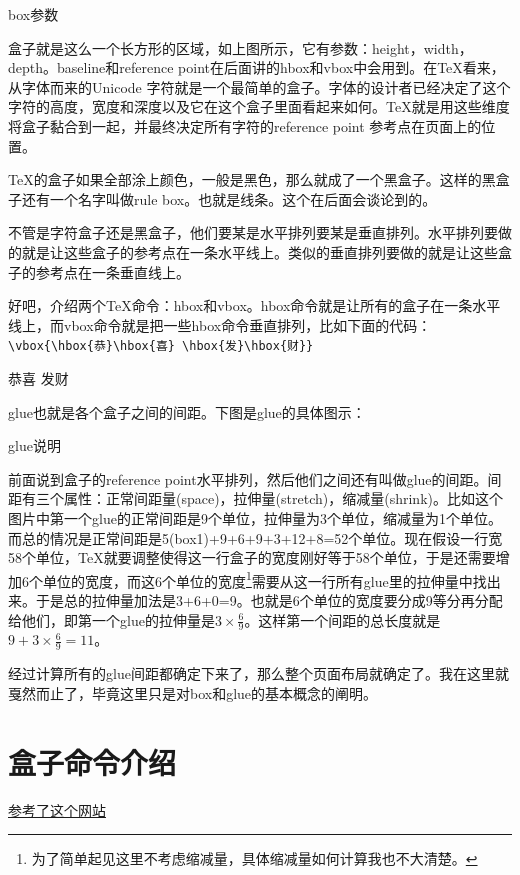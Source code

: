 \documentclass[12pt,oneside]{book}
\begin{document}
\begin{common-format}
\begin{linefig}[0.8]{box参数}
\label{fig:box参数}
\end{linefig}

盒子就是这么一个长方形的区域，如上图所示，它有参数：height\linebreak ，width，depth。baseline和reference point在后面讲的hbox和vbox中会用到。在\TeX 看来，从字体而来的Unicode 字符就是一个最简单的盒子。字体的设计者已经决定了这个字符的高度，宽度和深度以及它在这个盒子里面看起来如何。\TeX 就是用这些维度将盒子黏合到一起，并最终决定所有字符的reference point 参考点在页面上的位置。

\TeX 的盒子如果全部涂上颜色，一般是黑色，那么就成了一个黑盒子。这样的黑盒子还有一个名字叫做rule box。也就是线条。这个在后面会谈论到的。

不管是字符盒子还是黑盒子，他们要某是水平排列要某是垂直排列。水平排列要做的就是让这些盒子的参考点在一条水平线上。类似的垂直排列要做的就是让这些盒子的参考点在一条垂直线上。

好吧，介绍两个\TeX 命令：hbox和vbox。hbox命令就是让所有的盒子在一条水平线上，而vbox命令就是把一些hbox命令垂直排列，比如下面的代码：\\
\verb+\vbox{\hbox{恭}\hbox{喜} \hbox{发}\hbox{财}}+

\vbox{\hbox{恭}\hbox{喜} \hbox{发}\hbox{财}}

glue也就是各个盒子之间的间距。下图是glue的具体图示：
\begin{linefig}{glue说明}
\label{fig:glue说明}
\end{linefig}
前面说到盒子的reference point水平排列，然后他们之间还有叫做glue的间距。间距有三个属性：正常间距量(space)，拉伸量(stretch)，缩减量(shrink)。比如这个图片中第一个glue的正常间距是9个单位，拉伸量为3个单位，缩减量为1个单位。而总的情况是正常间距是5(box1)+9+6+9+3+12+8=52个单位。现在假设一行宽58个单位，\TeX 就要调整使得这一行盒子的宽度刚好等于58个单位，于是还需要增加6个单位的宽度，而这6个单位的宽度\footnote{为了简单起见这里不考虑缩减量，具体缩减量如何计算我也不大清楚。}需要从这一行所有glue里的拉伸量中找出来。于是总的拉伸量加法是3+6+0=9。也就是6个单位的宽度要分成9等分再分配给他们，即第一个glue的拉伸量是$3\times\frac { 6 }{ 9 } $。这样第一个间距的总长度就是$9+3\times\frac { 6 }{ 9 } =11$。

经过计算所有的glue间距都确定下来了，那么整个页面布局就确定了。我在这里就戛然而止了，毕竟这里只是对box和glue的基本概念的阐明。


\section{盒子命令介绍}
\href{http://tex.stackexchange.com/questions/83930/what-are-the-different-kinds-of-boxes-in-latex}{参考了这个网站}


\end{common-format}
\end{document}
